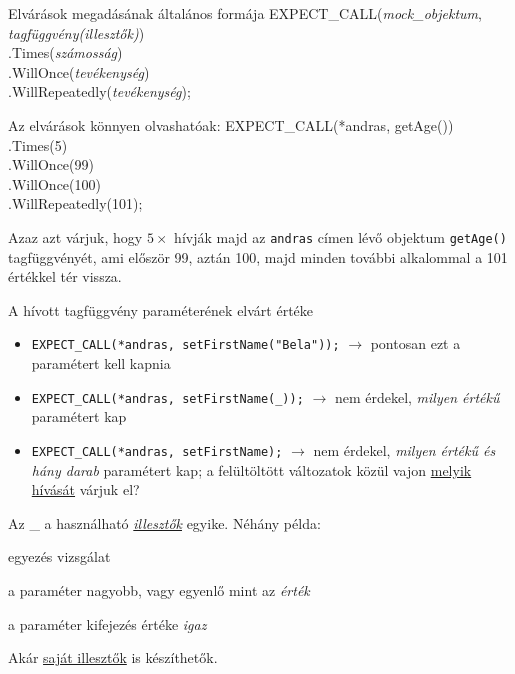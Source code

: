\documentclass[usenames,dvipsnames,aspectratio=169]{beamer}
\newcommand{\hiv}[1]{{\color{hivatkozasszin}#1}}
\begin{document}
\begin{frame}[fragile]
    \begin{exampleblock}{Elvárások megadásának általános formája}
        \footnotesize
        EXPECT\_CALL(\emph{mock\_objektum}, \emph{tagfüggvény(illesztők)})\\
        \qquad .Times(\emph{számosság})\\
        \qquad .WillOnce(\emph{tevékenység})\\
        \qquad .WillRepeatedly(\emph{tevékenység});\\
    \end{exampleblock}
    \begin{exampleblock}{Az elvárások könnyen olvashatóak:}
        \footnotesize
        EXPECT\_CALL(*andras, getAge())\\
        \qquad .Times(5)\\
        \qquad .WillOnce(99)\\
        \qquad .WillOnce(100)\\
        \qquad .WillRepeatedly(101);\\
    \end{exampleblock}
    \footnotesize
    Azaz azt várjuk, hogy $5\times$ hívják majd az \texttt{andras} címen lévő objektum \texttt{getAge()} tagfüggvényét, 
    ami először 99, aztán 100, majd minden további alkalommal a 101 értékkel tér vissza.
\end{frame}

\begin{frame}
    A hívott tagfüggvény paraméterének elvárt értéke
    \begin{itemize}
        \item \texttt{EXPECT\_CALL(*andras, setFirstName("Bela"));} $\to$ pontosan ezt a paramétert kell kapnia
        \item \texttt{EXPECT\_CALL(*andras, setFirstName(\_));} $\to$ nem érdekel, \emph{milyen értékű} paramétert kap
        \item \texttt{EXPECT\_CALL(*andras, setFirstName);} $\to$ nem érdekel, \emph{milyen értékű és hány darab} paramétert kap; 
        a felültöltött változatok közül vajon \hiv{\href{https://google.github.io/googletest/gmock\_cook\_book.html\#SelectOverload}{melyik hívását}} várjuk el?
    \end{itemize}
    Az \_ a használható \hiv{\href{https://google.github.io/googletest/reference/matchers.html\#wildcard}{\emph{illesztők}}} egyike. Néhány példa:
    \begin{description}[mm]
        \item[\texttt{Eq(\emph{érték})}] egyezés vizsgálat 
        \item[\texttt{Ge(\emph{érték})}] a paraméter nagyobb, vagy egyenlő mint az \emph{érték}
        \item[\texttt{IsTrue()}] a paraméter kifejezés értéke \emph{igaz}
    \end{description}
    Akár \hiv{\href{https://google.github.io/googletest/gmock\_cook\_book.html\#NewMatchers}{saját illesztők}} is készíthetők.
\end{frame}
\end{document}
